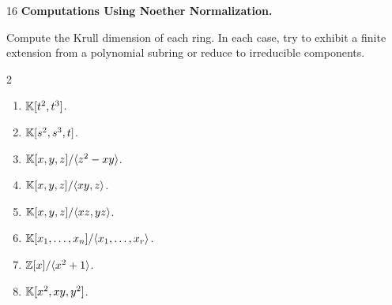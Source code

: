 \documentclass[Notebook.tex]{subfiles}
\begin{document}
\newpage

\begin{problem}{16}  \textbf{Computations Using Noether Normalization.} 
    
    Compute the Krull dimension of each ring. In each case, try to exhibit a finite extension from a polynomial subring or reduce to irreducible components.
    \begin{multicols}{2}
    \begin{enumerate}
        \item $\mathbb K[t^2,t^3]$.
        \item $\mathbb K[s^2,s^3,t]$.
        \item $\mathbb K[x,y,z]/\langle z^2-xy\rangle$.
        \item $\mathbb K[x,y,z]/\langle xy,z\rangle$.
        \item $\mathbb K[x,y,z]/\langle xz,yz\rangle$.
        \item $\mathbb K[x_1,\ldots,x_n]/\langle x_1,\ldots,x_r\rangle$.
        \item $\mathbb Z[x]/\langle x^2+1\rangle$.
        \item $\mathbb K[x^2,xy,y^2]$.
    \end{enumerate}
    \end{multicols}
\end{problem}
\end{document}
